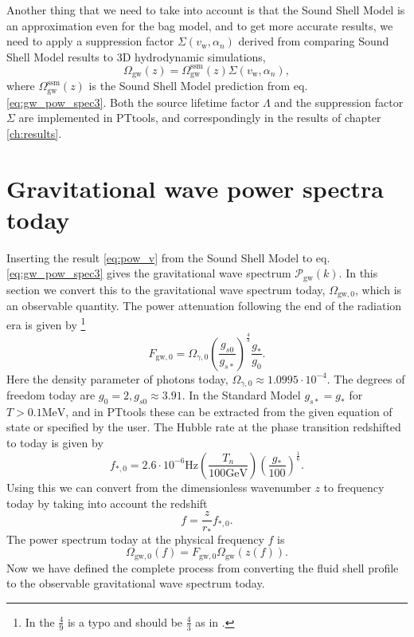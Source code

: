 Another thing that we need to take into account is that the Sound Shell Model is an approximation even for the bag model,
and to get more accurate results,
we need to apply a suppression factor $\Sigma(v_\text{w},\alpha_n)$ derived from comparing Sound Shell Model results to 3D hydrodynamic simulations,
\cite[eq. 2.9]{gowling_lisa_2021}
\begin{equation}
\Omega_\text{gw}(z) = \Omega_\text{gw}^\text{ssm}(z) \Sigma(v_\text{w},\alpha_n),
\end{equation}
where $\Omega_\text{gw}^\text{ssm}(z)$ is the Sound Shell Model prediction from eq. \eqref{eq:gw_pow_spec3}.
Both the source lifetime factor $\Lambda$ and the suppression factor $\Sigma$ are implemented in PTtools,
and correspondingly in the results of chapter \ref{ch:results}.


\section{Gravitational wave power spectra today}
\label{omgw0}
Inserting the result \eqref{eq:pow_v} from the Sound Shell Model to eq. \eqref{eq:gw_pow_spec3} gives the gravitational wave spectrum $\mathcal{P}_\text{gw}(k)$.
In this section we convert this to the gravitational wave spectrum today, $\Omega_{\text{gw},0}$, which is an observable quantity.
The power attenuation following the end of the radiation era is given by
\cites[eq. 2.11]{gowling_lisa_2021}[eq. 19]{caprini_detecting_2020}%
\footnote{In \cite[eq. 2.11]{gowling_lisa_2021} the $\frac{4}{9}$ is a typo and should be $\frac{4}{3}$ as in \cite[eq. 19]{caprini_detecting_2020}.}
\begin{equation}
F_{\text{gw},0} = \Omega_{\gamma,0} \left( \frac{g_{s0}}{g_{s*}} \right)^\frac{4}{3} \frac{g_*}{g_0}.
\end{equation}
Here the density parameter of photons today, $\Omega_{\gamma,0} \approx 1.0995 \cdot 10^{-4}$.
The degrees of freedom today are $g_0 = 2, g_{s0} \approx 3.91$.
In the Standard Model $g_{s*} = g_*$ for $T > 0.1 \text{MeV}$,
and in PTtools these can be extracted from the given equation of state or specified by the user.
The Hubble rate at the phase transition redshifted to today is given by
\cites[eq. 2.13]{gowling_lisa_2021}[eq. 31]{caprini_detecting_2020}
\begin{equation}
f_{*,0} = 2.6 \cdot 10^{-6} \text{Hz} \left( \frac{T_n}{100 \text{GeV}} \right) \left( \frac{g_*}{100} \right)^\frac{1}{6}.
\end{equation}
Using this we can convert from the dimensionless wavenumber $z$ to frequency today by taking into account the redshift
\cite[eq. 2.12]{gowling_lisa_2021}
\begin{equation}
f = \frac{z}{r_*} f_{*,0}.
\end{equation}
The power spectrum today at the physical frequency $f$ is
\cite[eq. 2.10]{gowling_lisa_2021}
\begin{equation}
\Omega_{\text{gw},0}(f) = F_{\text{gw},0} \Omega_\text{gw}(z(f)).
\end{equation}
Now we have defined the complete process from converting the fluid shell profile to the observable gravitational wave spectrum today.


